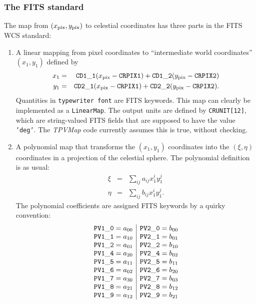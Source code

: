 \documentclass[11pt,preprint,flushrt]{aastex}
\begin{document}
\subsubsection{The FITS standard}
The map from $(x_{\rm pix},y_{\rm pix})$ to celestial coordinates has three parts in the FITS WCS standard:
\begin{enumerate}
\item A linear mapping from pixel coordinates to ``intermediate world coordinates'' $(x_1,y_1)$ defined by
\begin{eqnarray}
x_1 & = & {\tt CD1\_1}(x_{\rm pix}-{\tt CRPIX1}) + {\tt CD1\_2}(y_{\rm pix}-{\tt CRPIX2}) \\
y_1 & = & {\tt CD2\_1}(x_{\rm pix}-{\tt CRPIX1}) + {\tt CD2\_2}(y_{\rm pix}-{\tt CRPIX2}) .
\end{eqnarray}
Quantities in {\tt typewriter font} are FITS keywords.
This map can clearly be implemented as a {\tt LinearMap}.  The output units are defined by {\tt CRUNIT[12]}, which are string-valued FITS fields that are supposed to have the value {\tt 'deg'}.  The {\it TPVMap} code currently assumes this is true, without checking.
\item A polynomial map that transforms the $(x_1,y_1)$ coordinates into the $(\xi,\eta)$ coordinates in a projection of the celestial sphere.  The polynomial definition is as usual:
\begin{eqnarray}
\xi & = & \sum_{ij} a_{ij} x_1^i y_1^j \\
\eta & = & \sum_{ij} b_{ij} x_1^i y_1^j.
\end{eqnarray}
The polynomial coefficients are assigned FITS keywords by a quirky convention:
\begin{equation}
\begin{array}{c|c}
{\tt PV1\_0} = a_{00} & {\tt PV2\_0} = b_{00} \\
{\tt PV1\_1} = a_{10} & {\tt PV2\_1} = b_{01} \\
{\tt PV1\_2} = a_{01} & {\tt PV2\_2} = b_{10} \\
{\tt PV1\_4} = a_{20} & {\tt PV2\_4} = b_{02} \\
{\tt PV1\_5} = a_{11} & {\tt PV2\_5} = b_{11} \\
{\tt PV1\_6} = a_{02} & {\tt PV2\_6} = b_{20} \\
{\tt PV1\_7} = a_{30} & {\tt PV2\_7} = b_{03} \\
{\tt PV1\_8} = a_{21} & {\tt PV2\_8} = b_{12} \\
{\tt PV1\_9} = a_{12} & {\tt PV2\_9} = b_{21} \\

\end{array}
\end{equation}
\end{enumerate}
\end{document}
